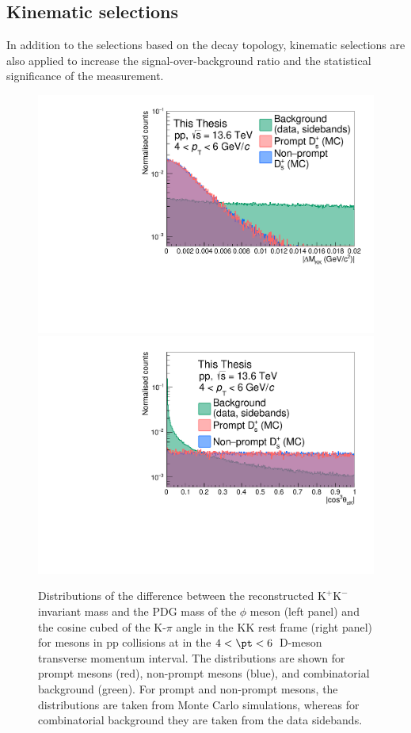 \subsection{Kinematic selections}
In addition to the selections based on the decay topology, kinematic selections are also applied to increase the signal-over-background ratio and the statistical significance of the measurement.
\begin{figure}[tb]
    \centering
    \includegraphics[width=0.48\linewidth]{Figures/Chapter 4/DeltaMassKK.pdf}
    \includegraphics[width=0.48\linewidth]{Figures/Chapter 4/AbsCos3PiK.pdf}
    \caption{Distributions of the difference between the reconstructed $\mathrm{K^+K^-}$ invariant mass and the PDG mass of the $\phi$ meson (left panel) and the cosine cubed of the K-$\pi$ angle in the KK rest frame (right panel) for \ds mesons in pp collisions at \thirteen in the $4 < \pt < 6$~\gevc D-meson transverse momentum interval. The distributions are shown for prompt \ds mesons (red), non-prompt \ds mesons (blue), and combinatorial background (green). For prompt and non-prompt \ds mesons, the distributions are taken from Monte Carlo simulations, whereas for combinatorial background they are taken from the data sidebands.}
    \label{fig:DeltaMassPhi}
\end{figure}


